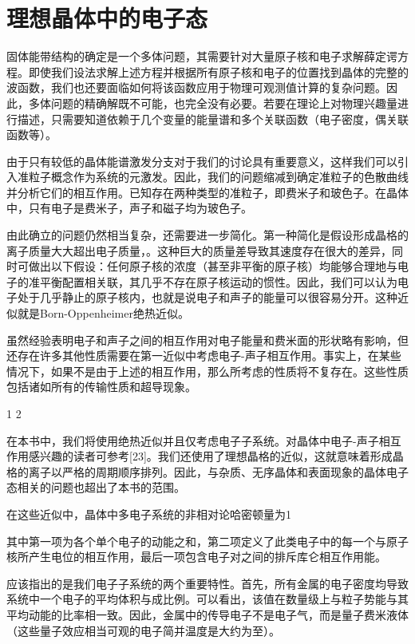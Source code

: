 \chapter{理想晶体中的电子态}\label{ideal_electron}
固体能带结构的确定是一个多体问题，其需要针对大量原子核和电子求解薛定谔方程。即使我们设法求解上述方程并根据所有原子核和电子的位置找到晶体的完整的波函数，我们也还要面临如何将该函数应用于物理可观测值计算的复杂问题。因此，多体问题的精确解既不可能，也完全没有必要。若要在理论上对物理兴趣量进行描述，只需要知道依赖于几个变量的能量谱和多个关联函数（电子密度，偶关联函数等）。

由于只有较低的晶体能谱激发分支对于我们的讨论具有重要意义，这样我们可以引入准粒子概念作为系统的元激发。因此，我们的问题缩减到确定准粒子的色散曲线并分析它们的相互作用。已知存在两种类型的准粒子，即费米子和玻色子。在晶体中，只有电子是费米子，声子和磁子均为玻色子。

由此确立的问题仍然相当复杂，还需要进一步简化。第一种简化是假设形成晶格的离子质量大大超出电子质量，。这种巨大的质量差导致其速度存在很大的差异，同时可做出以下假设：任何原子核的浓度（甚至非平衡的原子核）均能够合理地与电子的准平衡配置相关联，其几乎不存在原子核运动的惯性。因此，我们可以认为电子处于几乎静止的原子核内，也就是说电子和声子的能量可以很容易分开。这种近似就是Born-Oppenheimer绝热近似。

虽然经验表明电子和声子之间的相互作用对电子能量和费米面的形状略有影响，但还存在许多其他性质需要在第一近似中考虑电子-声子相互作用。事实上，在某些情况下，如果不是由于上述的相互作用，那么所考虑的性质将不复存在。这些性质包括诸如所有的传输性质和超导现象。



1
2






在本书中，我们将使用绝热近似并且仅考虑电子子系统。对晶体中电子-声子相互作用感兴趣的读者可参考[23]。我们还使用了理想晶格的近似，这就意味着形成晶格的离子以严格的周期顺序排列。因此，与杂质、无序晶体和表面现象的晶体电子态相关的问题也超出了本书的范围。

在这些近似中，晶体中多电子系统的非相对论哈密顿量为1

其中第一项为各个单个电子的动能之和，第二项定义了此类电子中的每一个与原子核所产生电位的相互作用，最后一项包含电子对之间的排斥库仑相互作用能。

应该指出的是我们电子子系统的两个重要特性。首先，所有金属的电子密度均导致系统中一个电子的平均体积与成比例。可以看出，该值在数量级上与粒子势能与其平均动能的比率相一致。因此，金属中的传导电子不是电子气，而是量子费米液体（这些量子效应相当可观的电子简并温度是大约为至）。

